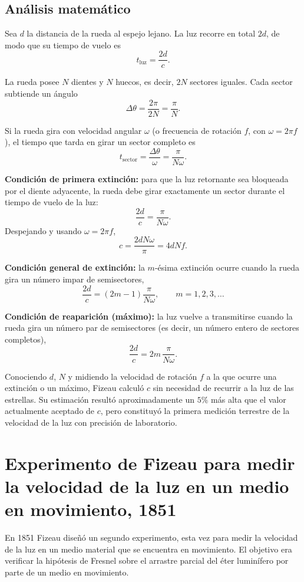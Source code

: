 \subsection{Análisis matemático}

Sea $d$ la distancia de la rueda al espejo lejano. La luz recorre en total $2d$, de modo que su tiempo de vuelo es
$$
t_{\text{luz}}=\frac{2d}{c}.
$$

La rueda posee $N$ dientes y $N$ huecos, es decir, $2N$ sectores iguales. Cada sector subtiende un ángulo
$$
\Delta\theta=\frac{2\pi}{2N}=\frac{\pi}{N}.
$$

Si la rueda gira con velocidad angular $\omega$ (o frecuencia de rotación $f$, con $\omega=2\pi f$), el tiempo que tarda en girar un sector completo es
$$
t_{\text{sector}}=\frac{\Delta\theta}{\omega}=\frac{\pi}{N\omega}.
$$

\textbf{Condición de primera extinción:} para que la luz retornante sea bloqueada por el diente adyacente, la rueda debe girar exactamente un sector durante el tiempo de vuelo de la luz:
$$
\frac{2d}{c}=\frac{\pi}{N\omega}.
$$
Despejando y usando $\omega=2\pi f$,
$$
c=\frac{2dN\omega}{\pi}=4dNf.
$$

\textbf{Condición general de extinción:} la $m$-ésima extinción ocurre cuando la rueda gira un número impar de semisectores,
$$
\frac{2d}{c}=(2m-1)\frac{\pi}{N\omega},\qquad m=1,2,3,\ldots
$$

\textbf{Condición de reaparición (máximo):} la luz vuelve a transmitirse cuando la rueda gira un número par de semisectores (es decir, un número entero de sectores completos),
$$
\frac{2d}{c}=2m\,\frac{\pi}{N\omega}.
$$

Conociendo $d$, $N$ y midiendo la velocidad de rotación $f$ a la que ocurre una extinción o un máximo, Fizeau calculó $c$ sin necesidad de recurrir a la luz de las estrellas. Su estimación resultó aproximadamente un $5\%$ más alta que el valor actualmente aceptado de $c$, pero constituyó la primera medición terrestre de la velocidad de la luz con precisión de laboratorio.



\section{Experimento de Fizeau para medir la velocidad de la luz en un medio en movimiento, 1851}

En 1851 Fizeau diseñó un segundo experimento, esta vez para medir la velocidad de la luz en un medio material que se encuentra en movimiento. El objetivo era verificar la hipótesis de Fresnel sobre el arrastre parcial del éter luminífero por parte de un medio en movimiento.

